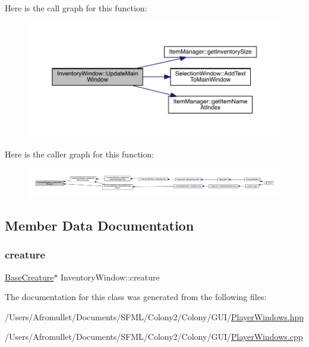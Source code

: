 Here is the call graph for this function\+:
\nopagebreak
\begin{figure}[H]
\begin{center}
\leavevmode
\includegraphics[width=350pt]{d1/dee/class_inventory_window_a02cf6a3724a6ca38f12de98b96e8a8e7_cgraph}
\end{center}
\end{figure}
Here is the caller graph for this function\+:
\nopagebreak
\begin{figure}[H]
\begin{center}
\leavevmode
\includegraphics[width=350pt]{d1/dee/class_inventory_window_a02cf6a3724a6ca38f12de98b96e8a8e7_icgraph}
\end{center}
\end{figure}


\subsection{Member Data Documentation}
\mbox{\label{class_inventory_window_a0a6e10b89b02f690ecd44792d7cb41e8}} 
\subsubsection{\texorpdfstring{creature}{creature}}
{\footnotesize\ttfamily \mbox{\hyperlink{class_base_creature}{Base\+Creature}}$\ast$ Inventory\+Window\+::creature\hspace{0.3cm}{\ttfamily [private]}}



The documentation for this class was generated from the following files\+:\begin{DoxyCompactItemize}
\item 
/\+Users/\+Afromullet/\+Documents/\+S\+F\+M\+L/\+Colony2/\+Colony/\+G\+U\+I/\mbox{\hyperlink{_player_windows_8hpp}{Player\+Windows.\+hpp}}\item 
/\+Users/\+Afromullet/\+Documents/\+S\+F\+M\+L/\+Colony2/\+Colony/\+G\+U\+I/\mbox{\hyperlink{_player_windows_8cpp}{Player\+Windows.\+cpp}}\end{DoxyCompactItemize}
